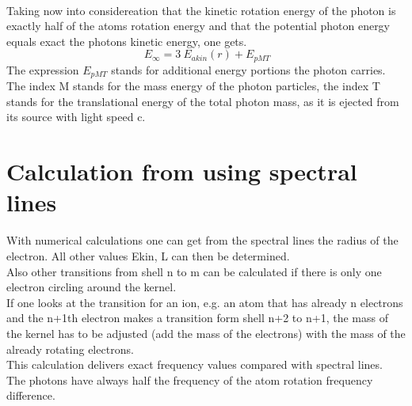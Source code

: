 \documentclass[10pt,titlepage]{article}
\begin{document}
\\
Taking now into considereation that the kinetic rotation energy of the photon is exactly half of the atoms rotation energy and that the potential photon energy equals exact the photons kinetic energy, one gets.
\begin{equation}
\ E_\infty=3 \ E_{akin}(r)+E_{pMT}
\end{equation}
The expression $E_{pMT}$ stands for additional energy portions the photon carries. The index M stands for the mass energy of the photon particles, the index T stands for the translational energy of the total photon mass, as it is ejected from its source with light speed c.
\\


\section{Calculation from using spectral lines}
With numerical calculations one can get from the spectral lines the radius of the electron. All other values Ekin, L can then be determined. \\
Also other transitions from shell n to m can be calculated if there is only one electron circling around the kernel.\\
If one looks at the transition for an ion, e.g. an atom that has already n electrons and the n+1th electron makes a transition form shell n+2 to n+1, the mass of the kernel has to be adjusted (add the mass of the electrons) with the mass of the already rotating electrons.\\
This calculation delivers exact frequency values compared with spectral lines.\\The photons have always half the frequency of the atom rotation frequency difference. \\\\


\end{document}
